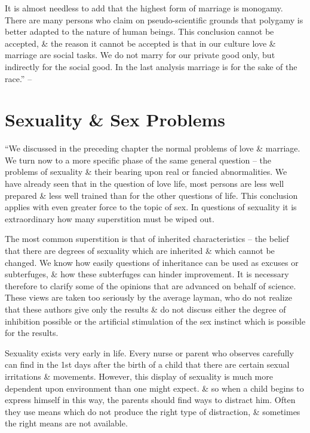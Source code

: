 \documentclass{article}
\begin{document}
It is almost needless to add that the highest form of marriage is monogamy. There are many persons who claim on pseudo-scientific grounds that polygamy is better adapted to the nature of human beings. This conclusion cannot be accepted, \& the reason it cannot be accepted is that in our culture love \& marriage are social tasks. We do not marry for our private good only, but indirectly for the social good. In the last analysis marriage is for the sake of the race.'' -- \cite[pp. 231--248]{Adler_science_living}


\section{Sexuality \& Sex Problems}
``We discussed in the preceding chapter the normal problems of love \& marriage. We turn now to a more specific phase of the same general question -- the problems of sexuality \& their bearing upon real or fancied abnormalities. We have already seen that in the question of love life, most persons are less well prepared \& less well trained than for the other questions of life. This conclusion applies with even greater force to the topic of sex. In questions of sexuality it is extraordinary how many superstition must be wiped out.

The most common superstition is that of inherited characteristics -- the belief that there are degrees of sexuality which are inherited \& which cannot be changed. We know how easily questions of inheritance can be used as excuses or subterfuges, \& how these subterfuges can hinder improvement. It is necessary therefore to clarify some of the opinions that are advanced on behalf of science. These views are taken too seriously by the average layman, who do not realize that these authors give only the results \& do not discuss either the degree of inhibition possible or the artificial stimulation of the sex instinct which is possible for the results.

Sexuality exists very early in life. Every nurse or parent who observes carefully can find in the 1st days after the birth of a child that there are certain sexual irritations \& movements. However, this display of sexuality is much more dependent upon environment than one might expect. \& so when a child begins to express himself in this way, the parents should find ways to distract him. Often they use means which do not produce the right type of distraction, \& sometimes the right means are not available.
\end{document}
